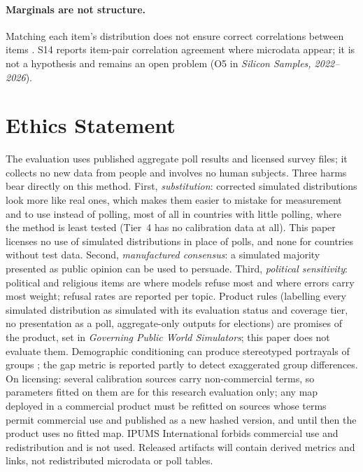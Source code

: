 \documentclass[11pt]{article}
\begin{document}
\paragraph{Marginals are not structure.} Matching each item's distribution does not ensure correct correlations between items \citep{williams2026beyond}. S14 reports item-pair correlation agreement where microdata appear; it is not a hypothesis and remains an open problem (O5 in \emph{Silicon Samples, 2022--2026}).

\section{Ethics Statement}
\label{sec:ethics}
The evaluation uses published aggregate poll results and licensed survey files; it collects no new data from people and involves no human subjects. Three harms bear directly on this method. First, \emph{substitution}: corrected simulated distributions look more like real ones, which makes them easier to mistake for measurement and to use instead of polling, most of all in countries with little polling, where the method is least tested (Tier~4 has no calibration data at all). This paper licenses no use of simulated distributions in place of polls, and none for countries without test data. Second, \emph{manufactured consensus}: a simulated majority presented as public opinion can be used to persuade. Third, \emph{political sensitivity}: political and religious items are where models refuse most and where errors carry most weight; refusal rates are reported per topic. Product rules (labelling every simulated distribution as simulated with its evaluation status and coverage tier, no presentation as a poll, aggregate-only outputs for elections) are promises of the product, set in \emph{Governing Public World Simulators}; this paper does not evaluate them. Demographic conditioning can produce stereotyped portrayals of groups \citep{wang2024flatten}; the gap metric is reported partly to detect exaggerated group differences. On licensing: several calibration sources carry non-commercial terms, so parameters fitted on them are for this research evaluation only; any map deployed in a commercial product must be refitted on sources whose terms permit commercial use and published as a new hashed version, and until then the product uses no fitted map. IPUMS International forbids commercial use and redistribution \citep{ipums2026terms} and is not used. Released artifacts will contain derived metrics and links, not redistributed microdata or poll tables.
\end{document}
